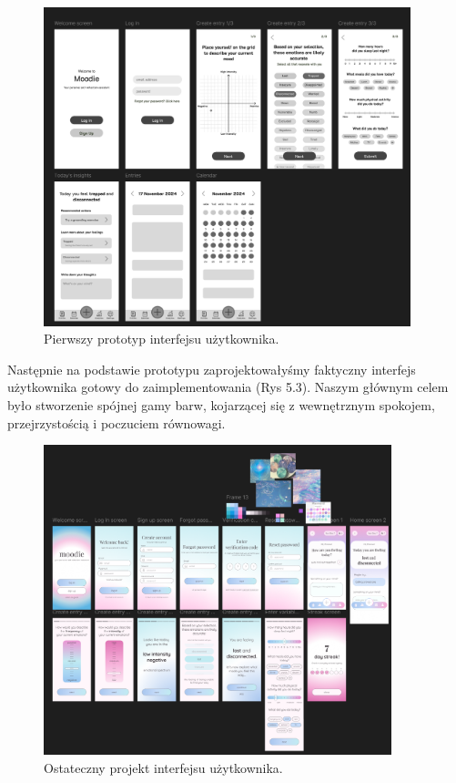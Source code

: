 \documentclass[inz, shortabstract]{iithesis}
\begin{document}
\begin{figure}[h]
\centering
\includegraphics[width=0.95\textwidth]{figma-ui-lofi.png} 
\caption{Pierwszy prototyp interfejsu użytkownika.}
\end{figure}

Następnie na podstawie prototypu zaprojektowałyśmy faktyczny interfejs użytkownika gotowy do zaimplementowania (Rys 5.3). Naszym głównym celem było stworzenie spójnej gamy barw, kojarzącej się z wewnętrznym spokojem, przejrzystością i poczuciem równowagi.


\begin{figure}[h]
\centering
\includegraphics[width=0.9\textwidth]{figma-ui.png} 
\caption{Ostateczny projekt interfejsu użytkownika.}
\end{figure}
\end{document}
